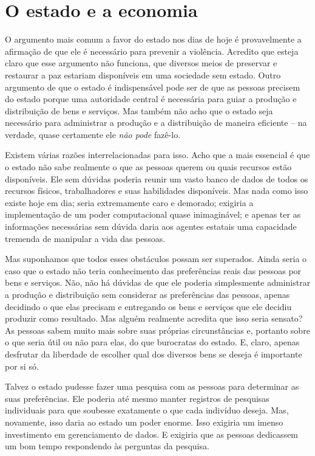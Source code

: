 \section{O estado e a economia}

O argumento mais comum a favor do estado nos dias de hoje é provavelmente a afirmação de que ele é necessário para prevenir a violência. Acredito que esteja claro que esse argumento não funciona, que diversos meios de preservar e restaurar a paz estariam disponíveis em uma sociedade sem estado. Outro argumento de que o estado é indispensável pode ser de que as pessoas precisem do estado porque uma autoridade central é necessária para guiar a produção e distribuição de bens e serviços. Mas também não acho que o estado seja necessário para administrar a produção e a distribuição de maneira eficiente -- na verdade, quase certamente ele \emph{não pode} fazê-lo.

Existem várias razões interrelacionadas para isso. Acho que a mais essencial é que o estado não sabe realmente o que as pessoas querem ou quais recursos estão disponíveis. Ele sem dúvidas poderia reunir um vasto banco de dados de todos os recursos físicos, trabalhadores e suas habilidades disponíveis. Mas nada como isso existe hoje em dia; seria extremamente caro e demorado; exigiria a implementação de um poder computacional quase inimaginável; e apenas ter as informações necessárias sem dúvida daria aos agentes estatais uma capacidade tremenda de manipular a vida das pessoas.

Mas suponhamos que todos esses obstáculos possam ser superados. Ainda seria o caso que o estado não teria conhecimento das preferências reais das pessoas por bens e serviços. Não, não há dúvidas de que ele poderia simplesmente administrar a produção e distribuição sem considerar as preferências das pessoas, apenas decidindo o que elas precisam e entregando os bens e serviços que ele decidiu produzir como resultado. Mas alguém realmente acredita que isso seria sensato? As pessoas sabem muito mais sobre suas próprias circunstâncias e, portanto sobre o que seria útil ou não para elas, do que burocratas do estado. E, claro, apenas desfrutar da liberdade de escolher qual dos diversos bens se deseja é importante por si só.

Talvez o estado pudesse fazer uma pesquisa com as pessoas para determinar as suas preferências. Ele poderia até mesmo manter registros de pesquisas individuais para que soubesse exatamente o que cada indivíduo deseja. Mas, novamente, isso daria ao estado um poder enorme. Isso exigiria um imenso investimento em gerenciamento de dados. E exigiria que as pessoas dedicassem um bom tempo respondendo às perguntas da pesquisa.

